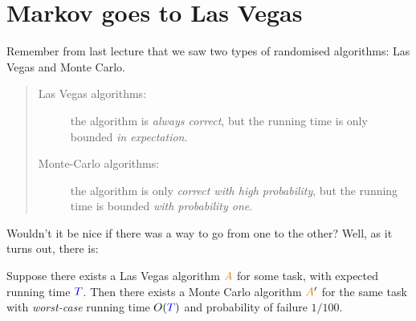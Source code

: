 \section{Markov goes to Las Vegas}

Remember from last lecture that we saw two types of randomised algorithms: {Las Vegas} and {Monte Carlo}.

\begin{quote}
\begin{description}
    \item[Las Vegas algorithms:] the algorithm is \emph{always correct}, but the running time is only bounded \emph{in expectation}. 
    \item[Monte-Carlo algorithms:] the algorithm is only \emph{correct with high probability}, but the running time is bounded \emph{with probability one}. 
\end{description}
\end{quote}
Wouldn't it be nice if there was a way to go from one to the other? Well, as it turns out, there is:
\begin{lemma}
    \label{lemma:lvtomc}
    Suppose there exists a Las Vegas algorithm $\Algo$ for some task, with expected running time $\textcolor{blue}{T}$. Then there exists a Monte Carlo algorithm $\Algo'$ for the same task with \emph{worst-case} running time $O(\textcolor{blue}{T})$ and probability of failure $1/100$.
\end{lemma}
